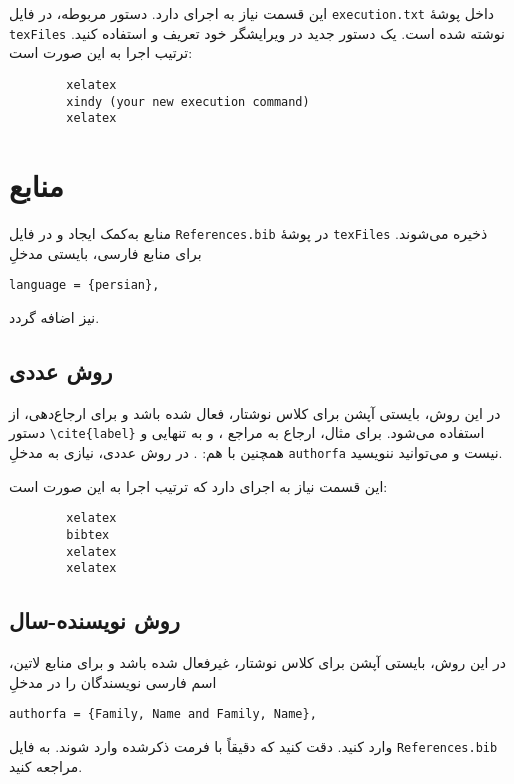 این قسمت نیاز به اجرای
دارد. دستور مربوطه، در فایل
\verb|execution.txt|
داخل پوشهٔ
\verb|texFiles|
نوشته شده است. یک دستور جدید در ویرایشگر خود تعریف و استفاده کنید. ترتیب اجرا به این صورت است:
\begin{latin}
	\begin{verbatim}
		xelatex
		xindy (your new execution command)
		xelatex
	\end{verbatim}
\end{latin}
\fi

\section{منابع}
منابع به‌کمک
ایجاد و در فایل
\verb|References.bib|
در پوشهٔ
\verb|texFiles|
ذخیره می‌شوند. برای منابع فارسی، بایستی مدخلِ
\begin{latin*}
	\verb|language = {persian},|
\end{latin*}
نیز اضافه گردد.

\subsection{روش عددی}
در این روش، بایستی آپشن
برای کلاس نوشتار، فعال شده باشد و برای ارجاع‌دهی، از دستور
\verb|\cite{label}|
استفاده می‌شود. برای مثال، ارجاع به مراجع
\cite{abtahi1388latex}،
\cite{oommen2002}
و
\cite{knuth1984texbook}
به تنهایی و همچنین با هم:
\cite{abtahi1388latex,oommen2002,knuth1984texbook}.
در روش عددی، نیازی به مدخلِ
\texttt{authorfa}
نیست و می‌توانید ننویسید.

این قسمت نیاز به اجرای
دارد که ترتیب اجرا به این صورت است:
\begin{latin}
	\begin{verbatim}
		xelatex
		bibtex
		xelatex
		xelatex
	\end{verbatim}
\end{latin}

\subsection{روش نویسنده-سال}
در این روش، بایستی آپشن
برای کلاس نوشتار، غیرفعال شده باشد و برای منابع لاتین، اسم فارسی نویسندگان را در مدخلِ
\begin{latin*}
	\verb|authorfa = {Family, Name and Family, Name},|
\end{latin*}
وارد کنید. دقت کنید که دقیقاً با فرمت ذکرشده وارد شوند. به فایل
\verb|References.bib|
مراجعه کنید.

